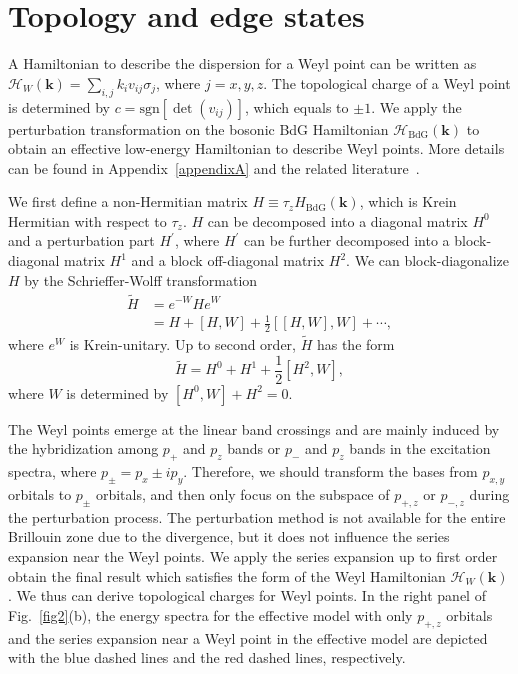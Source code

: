 \documentclass[aps,pra,floatfix,twocolumn,superscriptaddress]{revtex4-1}
\begin{document}
\section{Topology and edge states}
\label{Topology}
A Hamiltonian to describe the dispersion for a Weyl point can be written as $\mathcal{H}_W(\mathbf{k})=\sum_{i,j}k_iv_{ij}\sigma_j$, where $j=x,y,z$. The topological charge of a Weyl point is determined by $c=\text{sgn}[\det (v_{ij})]$, which equals to $\pm 1$. We apply the perturbation transformation on the bosonic BdG Hamiltonian $\mathcal{H}_{\mathrm{BdG}}(\mathbf{k})$ to obtain an effective low-energy Hamiltonian to describe Weyl points. More details can be found in Appendix~\ref{appendixA} and the related literature~\cite{Zhou_2020,PhysRevA.103.013308,PhysRevB.106.144434}.

We first define a non-Hermitian matrix $H\equiv\tau_zH_\mathrm{BdG}(\mathbf{k})$, which is Krein Hermitian with respect to $\tau_z$. $H$ can be decomposed into a diagonal matrix $H^0$ and a perturbation part $H^\prime$, where $H^\prime$ can be further decomposed into a block-diagonal matrix $H^1$ and a block off-diagonal matrix $H^2$. We can block-diagonalize $H$ by the Schrieffer-Wolff transformation
\begin{equation}
	\begin{aligned}
		\tilde{H}&=e^{-W}He^{W}\\
		&=H+[H,W]+\frac{1}{2}[[H,W],W]+\cdots,
	\end{aligned}
\end{equation}
where $e^W$ is Krein-unitary. Up to second order, $\tilde{H}$ has the form
\begin{equation}
\tilde{H}=H^0+H^1+\frac{1}{2}[H^2,W],
\end{equation}
where $W$ is determined by $[H^0,W]+H^2=0$.

The Weyl points emerge at the linear band crossings and are mainly induced by the hybridization  among $p_+$ and $p_z$ bands or $p_-$ and $p_z$ bands in the excitation spectra, where $p_\pm =p_x \pm i p_y$. Therefore, we should transform the bases from $p_{x,y}$ orbitals to $p_{\pm}$ orbitals, and then only focus on the subspace of $p_{+,z}$ or $p_{-,z}$ during the perturbation process. The perturbation method is not available for the entire Brillouin zone due to the divergence, but it does not influence the series expansion near the Weyl points. We apply the series expansion up to first order obtain the final result which satisfies the form of the Weyl Hamiltonian $\mathcal{H}_W(\mathbf{k})$. We thus can derive topological charges for Weyl points. In the right panel of Fig.~\ref{fig2}(b), the energy spectra for the effective model with only $p_{+,z}$ orbitals and the series expansion near a Weyl point in the effective model are depicted with the blue dashed lines and the red dashed lines, respectively.
\end{document}
